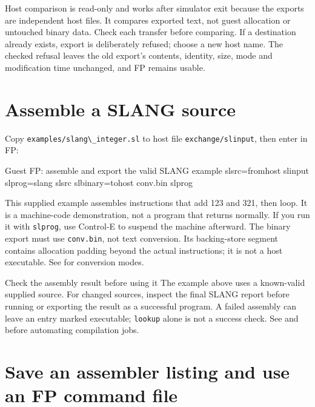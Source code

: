 Host comparison is read-only and works after simulator exit because the
exports are independent host files. It compares exported text, not guest
allocation or untouched binary data. Check each transfer before comparing.
If a destination already exists, export is deliberately refused; choose a
new host name. The checked refusal leaves the old export's contents, identity,
size, mode and modification time unchanged, and FP remains usable.

\section{Assemble a SLANG source}\label{assemble-a-slang-source}

Copy \passthrough{\lstinline!examples/slang\_integer.sl!} to host file \passthrough{\lstinline!exchange/slinput!}, then enter in FP:

\begin{commandexample}{Guest FP: assemble and export the valid SLANG example}
slsrc=fromhost slinput
slprog=slang slsrc
slbinary=tohost conv.bin slprog
\end{commandexample}

This supplied example assembles instructions that add 123 and 321, then loop. It is a machine-code demonstration, not a program that returns normally. If you run it with \passthrough{\lstinline!slprog!}, use Control-E to suspend the machine afterward. The binary export must use \passthrough{\lstinline!conv.bin!}, not text conversion. Its backing-store segment contains allocation padding beyond the actual instructions; it is not a host executable. See  for conversion modes.

\begin{operationnote}{Check the assembly result before using it}
The example above uses a known-valid supplied source. For changed sources,
inspect the final SLANG report before running or exporting the result as a
successful program. A failed assembly can leave an entry marked executable;
\texttt{lookup} alone is not a success check. See
 and
before automating compilation jobs.
\end{operationnote}

\section{Save an assembler listing and use an FP command file}\label{save-an-assembler-listing-and-use-an-fp-command-file}

